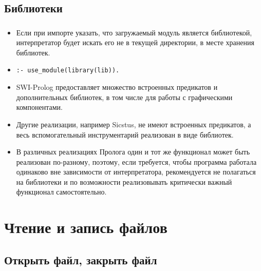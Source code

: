 \subsection{Библиотеки}


\begin{frame}

	\frametitle{\insertsection}
	\framesubtitle{\insertsubsection}
	
	\begin{itemize}
		\item Если при импорте указать, что загружаемый модуль является библиотекой, интерпретатор будет искать его не в текущей директории, в
		месте хранения библиотек.
		\item \texttt{:- use\_module(library(lib)).}
		\item SWI-Prolog предоставляет множество встроенных предикатов и дополнительных библиотек, в том числе для работы с графическими компонентами.
		\item Другие реализации, например Sicstus, не имеют встроенных предикатов, а весь вспомогательный инструментарий реализован в виде библиотек.
		\item В различных реализациях Пролога один и тот же функционал может быть реализован по-разному, поэтому, если требуется, чтобы программа работала одинаково вне зависимости от интерпретатора, рекомендуется не полагаться на библиотеки и по возможности реализовывать критически важный функционал
		самостоятельно.
	\end{itemize}

\end{frame}


\section{Чтение и запись файлов}

\begin{frame}

	\begin{center}
		\Huge \insertsection
	\end{center}

\end{frame}

\subsection{Открыть файл, закрыть файл}


